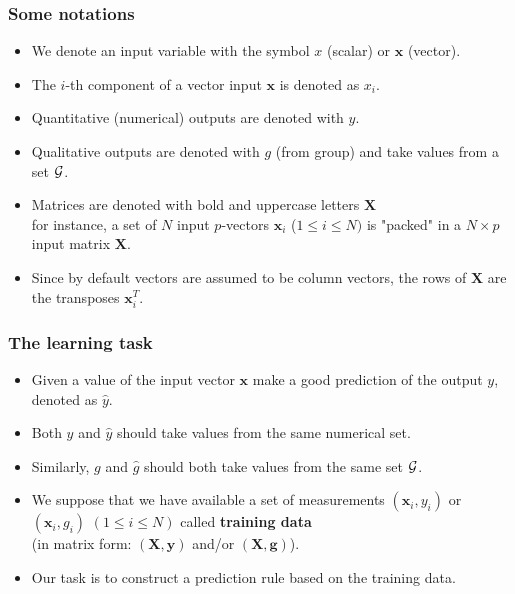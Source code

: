 \documentclass[notes]{beamer}          %
\newcommand{\vect}[1]{\bm{#1}}
\begin{document}
\begin{frame}
\frametitle{Some notations}
    \begin{itemize}
        \item We denote an input variable with the symbol $x$ (scalar) or $\vect{x}$ (vector).
        \item The $i$-th component of a vector input $\vect{x}$ is denoted as $x_i$.
        \item Quantitative (numerical) outputs are denoted with $y$.
        \item Qualitative outputs are denoted with $g$ (from group) and take values from a set $\cal{G}$.
        \item Matrices are denoted with bold and uppercase letters $\vect{X}$\\
        for instance, a set of $N$ input $p$-vectors $\vect{x}_i$ ($1 \leq i \leq N)$ is "packed" in a $N \times p$ input matrix $\vect{X}$.
        \item Since by default vectors are assumed to be column vectors, the rows of $\vect{X}$ are the transposes $\vect{x}_i^T$.
    \end{itemize}
\end{frame}

\begin{frame}
\frametitle{The learning task}
    \begin{itemize}
        \item Given a value of the input vector $\vect{x}$ make a good prediction of the output $y$, denoted as $\hat{y}$.
        \item Both $y$ and $\hat{y}$ should take values from the same numerical set.
        \item Similarly, $g$ and $\hat{g}$ should both take values from the same set $\cal{G}$.
         \item We suppose that we have available a set of measurements $(\vect{x}_i,y_i)$ or $(\vect{x}_i,g_i)$ $(1 \leq i \leq N)$ called {\bf training data} \\
         (in matrix form: $(\vect{X},\vect{y})$ and/or $(\vect{X},\vect{g})$).
        \item Our task is to construct a prediction rule based on the training data.

    \end{itemize}

\end{frame}
\end{document}
